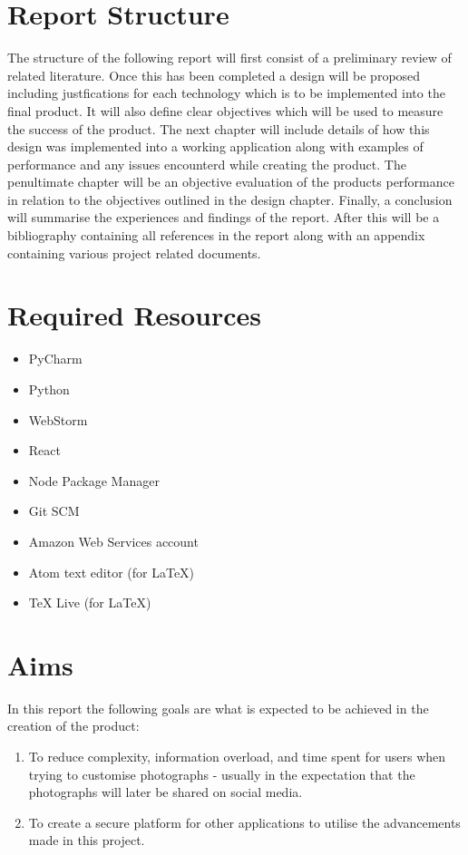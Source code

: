 \documentclass[a4paper,12pt]{report}
\begin{document}
  \section{Report Structure}
    The structure of the following report will first consist of a preliminary review of related literature. Once this has been completed a design will be proposed including justfications for each technology which is to be implemented into the final product. It will also define clear objectives which will be used to measure the success of the product. The next chapter will include details of how this design was implemented into a working application along with examples of performance and any issues encounterd while creating the product. The penultimate chapter will be an objective evaluation of the products performance in relation to the objectives outlined in the design chapter. Finally, a conclusion will summarise the experiences and findings of the report. After this will be a bibliography containing all references in the report along with an appendix containing various project related documents.

  \newpage
  \section{Required Resources}
    \singlespacing
    \begin{itemize}
      \item PyCharm
      \item Python
      \item WebStorm
      \item React
      \item Node Package Manager
      \item Git SCM
      \item Amazon Web Services account
      \item Atom text editor (for \LaTeX)
      \item TeX Live (for \LaTeX)
    \end{itemize}
    \doublespacing

  \section{Aims} \label{sec:aims}
    In this report the following goals are what is expected to be achieved in the creation of the product:

    \begin{enumerate}
      \item To reduce complexity, information overload, and time spent for users when trying to customise photographs - usually in the expectation that the photographs will later be shared on social media.
      \item To create a secure platform for other applications to utilise the advancements made in this project.
    \end{enumerate}
\end{document}
